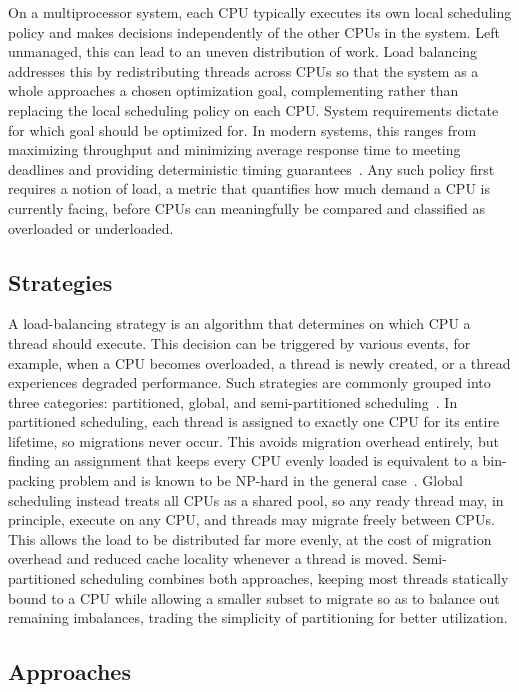 On a multiprocessor system, each CPU typically executes its own local scheduling policy and makes decisions independently of the other CPUs in the system.
Left unmanaged, this can lead to an uneven distribution of work.
Load balancing addresses this by redistributing threads across CPUs so that the system as a whole approaches a chosen optimization goal, complementing rather than replacing the local scheduling policy on each CPU.
System requirements dictate for which goal should be optimized for.
In modern systems, this ranges from maximizing throughput and minimizing average response time to meeting deadlines and providing deterministic timing guarantees~\cite{load-balancing}.
Any such policy first requires a notion of load, a metric that quantifies how much demand a CPU is currently facing, before CPUs can meaningfully be compared and classified as overloaded or underloaded.

\subsection{Strategies}

A load-balancing strategy is an algorithm that determines on which CPU a thread should execute.
This decision can be triggered by various events, for example, when a CPU becomes overloaded, a thread is newly created, or a thread experiences degraded performance.
Such strategies are commonly grouped into three categories: partitioned, global, and semi-partitioned scheduling~\cite{acm-loadbalancing-algos}.
In partitioned scheduling, each thread is assigned to exactly one CPU for its entire lifetime, so migrations never occur.
This avoids migration overhead entirely, but finding an assignment that keeps every CPU evenly loaded is equivalent to a bin-packing problem and is known to be NP-hard in the general case~\cite{semi-np-hardness}.
Global scheduling instead treats all CPUs as a shared pool, so any ready thread may, in principle, execute on any CPU, and threads may migrate freely between CPUs.
This allows the load to be distributed far more evenly, at the cost of migration overhead and reduced cache locality whenever a thread is moved.
Semi-partitioned scheduling combines both approaches, keeping most threads statically bound to a CPU while allowing a smaller subset to migrate so as to balance out remaining imbalances, trading the simplicity of partitioning for better utilization.

\subsection{Approaches}
\label{sec:approaches}

